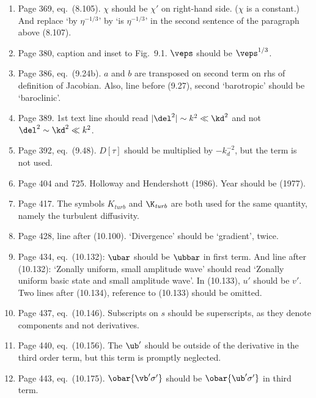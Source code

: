 \documentclass[10pt]{article}
\newcommand{\eq}{eq.\ } \newcommand{\Eq}{Eq.\ }
\begin{document}
\begin{enumerate}
\item Page 369, \eq (8.105). $\chi$ should be $\chi'$ on right-hand side. ($\chi$ is a constant.) And replace `by $\eta^{-1/3}$' by `is $\eta^{-1/3}$' in
the second sentence of the paragraph above (8.107). 

\item Page 380, caption and inset to Fig.\ 9.1. $\veps$ should be $\veps^{1/3}$. 

\item Page 386, \eq (9.24b). $a$ and $b$ are transposed on second term on rhs of definition of Jacobian. Also, line before (9.27), second `barotropic' should be `baroclinic'.

\item Page 389. 1st text line should read $|\del^2| \sim
k^2 \ll \kd^2$ and not $\del^2 \sim
\kd^2 \ll k^2$.

\item Page 392, \eq (9.48). $D[\tau]$ should be multiplied by $-k_d^{-2}$, but the term is not used.

\item Page 404 and 725. Holloway and Hendershott (1986). Year should be (1977).

\item Page 417. The symbols $K_{\textit{turb}}$ and $\K_{\textit{turb}}$ are both used for the same quantity, namely the turbulent diffusivity.

\item Page 428, line after (10.100). `Divergence' should be `gradient', twice.

\item Page 434, \eq (10.132): $\ubar$ should be $\ubbar$ in first term. And line after (10.132): `Zonally uniform, small amplitude wave' should read `Zonally uniform basic state and small amplitude wave'. In (10.133), $u'$ should be $v'$. Two lines after (10.134), reference to (10.133) should be omitted.

\item Page 437, \eq (10.146). Subscripts on $s$ should be superscripts, as they denote components and not derivatives. 

\item Page 440, \eq (10.156). The $\ub'$ should be outside of the derivative in the third order term, but this term is promptly neglected. 

\item Page 443, \eq (10.175). $\obar{\vb' \sigma'}$ should be $\obar{\ub' \sigma'}$ in third term.
 

\end{enumerate}
\end{document}

